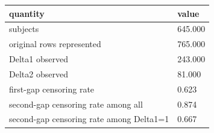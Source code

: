 \begin{tabular}{ll}
\hline
quantity & value \\
\hline
subjects & 645.000 \\
original rows represented & 765.000 \\
Delta1 observed & 243.000 \\
Delta2 observed & 81.000 \\
first-gap censoring rate & 0.623 \\
second-gap censoring rate among all & 0.874 \\
second-gap censoring rate among Delta1=1 & 0.667 \\
\hline
\end{tabular}
